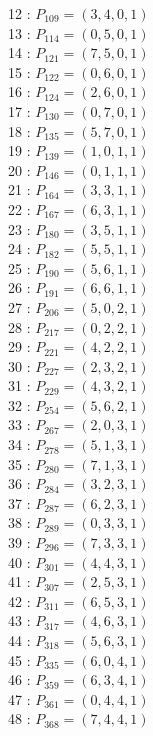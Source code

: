 \documentclass{article}
\begin{document}
{\begin{multicols}{3}
12 : $P_{109}=( 3, 4, 0, 1 )$\\
13 : $P_{114}=( 0, 5, 0, 1 )$\\
14 : $P_{121}=( 7, 5, 0, 1 )$\\
15 : $P_{122}=( 0, 6, 0, 1 )$\\
16 : $P_{124}=( 2, 6, 0, 1 )$\\
17 : $P_{130}=( 0, 7, 0, 1 )$\\
18 : $P_{135}=( 5, 7, 0, 1 )$\\
19 : $P_{139}=( 1, 0, 1, 1 )$\\
20 : $P_{146}=( 0, 1, 1, 1 )$\\
21 : $P_{164}=( 3, 3, 1, 1 )$\\
22 : $P_{167}=( 6, 3, 1, 1 )$\\
23 : $P_{180}=( 3, 5, 1, 1 )$\\
24 : $P_{182}=( 5, 5, 1, 1 )$\\
25 : $P_{190}=( 5, 6, 1, 1 )$\\
26 : $P_{191}=( 6, 6, 1, 1 )$\\
27 : $P_{206}=( 5, 0, 2, 1 )$\\
28 : $P_{217}=( 0, 2, 2, 1 )$\\
29 : $P_{221}=( 4, 2, 2, 1 )$\\
30 : $P_{227}=( 2, 3, 2, 1 )$\\
31 : $P_{229}=( 4, 3, 2, 1 )$\\
32 : $P_{254}=( 5, 6, 2, 1 )$\\
33 : $P_{267}=( 2, 0, 3, 1 )$\\
34 : $P_{278}=( 5, 1, 3, 1 )$\\
35 : $P_{280}=( 7, 1, 3, 1 )$\\
36 : $P_{284}=( 3, 2, 3, 1 )$\\
37 : $P_{287}=( 6, 2, 3, 1 )$\\
38 : $P_{289}=( 0, 3, 3, 1 )$\\
39 : $P_{296}=( 7, 3, 3, 1 )$\\
40 : $P_{301}=( 4, 4, 3, 1 )$\\
41 : $P_{307}=( 2, 5, 3, 1 )$\\
42 : $P_{311}=( 6, 5, 3, 1 )$\\
43 : $P_{317}=( 4, 6, 3, 1 )$\\
44 : $P_{318}=( 5, 6, 3, 1 )$\\
45 : $P_{335}=( 6, 0, 4, 1 )$\\
46 : $P_{359}=( 6, 3, 4, 1 )$\\
47 : $P_{361}=( 0, 4, 4, 1 )$\\
48 : $P_{368}=( 7, 4, 4, 1 )$\\

\end{multicols}}
\end{document}
